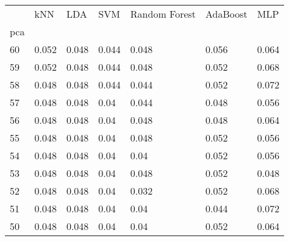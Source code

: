 \begin{tabular}{lllllll}
\toprule
{} &    kNN &    LDA &    SVM & Random Forest & AdaBoost &    MLP \\
pca &        &        &        &               &          &        \\
\midrule
60  &  0.052 &  0.048 &  0.044 &         0.048 &    0.056 &  0.064 \\
59  &  0.052 &  0.048 &  0.044 &         0.048 &    0.052 &  0.068 \\
58  &  0.048 &  0.048 &  0.044 &         0.044 &    0.052 &  0.072 \\
57  &  0.048 &  0.048 &   0.04 &         0.044 &    0.048 &  0.056 \\
56  &  0.048 &  0.048 &   0.04 &         0.048 &    0.048 &  0.064 \\
55  &  0.048 &  0.048 &   0.04 &         0.048 &    0.052 &  0.056 \\
54  &  0.048 &  0.048 &   0.04 &          0.04 &    0.052 &  0.056 \\
53  &  0.048 &  0.048 &   0.04 &         0.048 &    0.052 &  0.048 \\
52  &  0.048 &  0.048 &   0.04 &         0.032 &    0.052 &  0.068 \\
51  &  0.048 &  0.048 &   0.04 &          0.04 &    0.044 &  0.072 \\
50  &  0.048 &  0.048 &   0.04 &          0.04 &    0.052 &  0.064 \\
\bottomrule
\end{tabular}
